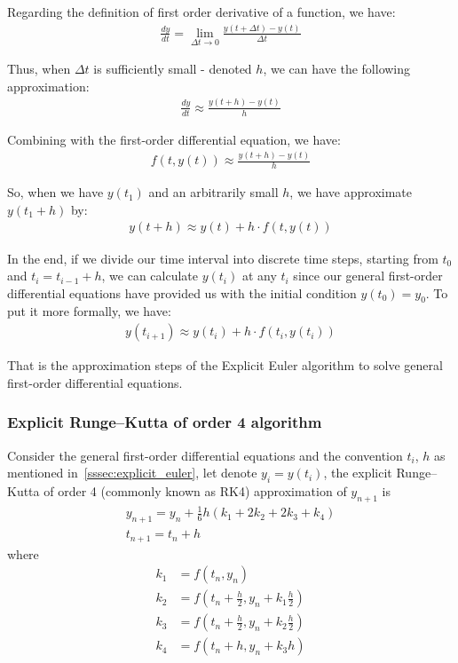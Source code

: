 \documentclass[a4paper]{article}
\begin{document}
Regarding the definition of first order derivative of a function, we have:
\begin{align*}
  \frac{dy}{dt} = \lim_{\Delta t \rightarrow 0} \frac{y(t + \Delta t) - y(t)}{\Delta t}
\end{align*}

Thus, when \(\Delta t\) is sufficiently small - denoted \(h\), we can have the following approximation:
\begin{align*}
  \frac{dy}{dt} \approx \frac{y(t + h) - y(t)}{h}
\end{align*}

Combining with the first-order differential equation, we have:
\begin{align*}
  f(t,y(t)) \approx \frac{y(t + h) - y(t)}{h}
\end{align*}

So, when we have \(y(t_1)\) and an arbitrarily small \(h\), we have approximate \(y(t_1 + h)\) by:
\begin{align*}
  y(t + h) \approx y(t) + h \cdot f(t,y(t))
\end{align*}

In the end, if we divide our time interval into discrete time steps, starting from \(t_0\) and \(t_i = t_{i-1} + h\), we can calculate \(y(t_i)\) at any \(t_i\) since our general first-order differential equations have provided us with the initial condition \(y(t_0) = y_0\). To put it more formally, we have:
\begin{align*}
  y(t_{i+1}) \approx y(t_i) + h \cdot f(t_i, y(t_i))
\end{align*}

That is the approximation steps of the Explicit Euler algorithm to solve general first-order differential equations.

\subsubsection{Explicit Runge–Kutta of order 4 algorithm}
Consider the general first-order differential equations and the convention \(t_i\), \(h\) as mentioned in~\ref{sssec:explicit_euler}, let denote \(y_i = y(t_i)\), the explicit Runge–Kutta of order 4 (commonly known as RK4) approximation of \(y_{n+1}\) is
\begin{align*}
  y_{n+1} = y_n + \frac{1}{6}h(k_1 + 2k_2 + 2k_3 + k_4) \\
  t_{n+1} = t_n + h
\end{align*}
where
\begin{align*}
  k_1 & = f(t_n, y_n)                                            \\
  k_2 & = f \left(t_n + \frac{h}{2}, y_n + k_1\frac{h}{2}\right) \\
  k_3 & = f \left(t_n + \frac{h}{2}, y_n + k_2\frac{h}{2}\right) \\
  k_4 & = f(t_n + h, y_n + k_3h)
\end{align*}
\end{document}
